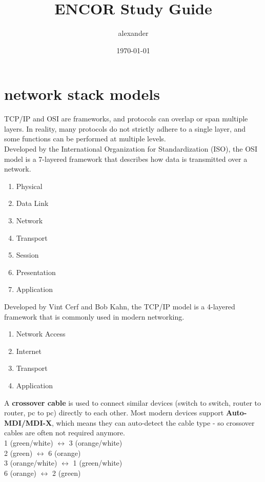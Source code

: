 \documentclass{article}
\title{ENCOR Study Guide}
\author{alexander}
\date{\today}
\begin{document}
\maketitle

\section*{network stack models}

TCP/IP and OSI are frameworks, and protocols can overlap or span multiple layers. In reality, many protocols do not strictly adhere to a single layer, and some functions can be performed at multiple levels.\\

Developed by the International Organization for Standardization (ISO), the OSI model is a 
7-layered framework that describes how data is transmitted over a network.	
	\begin{enumerate}
		\item Physical
		\item Data Link
		\item Network
		\item Transport
		\item Session
		\item Presentation
		\item Application
	\end{enumerate}

Developed by Vint Cerf and Bob Kahn, the TCP/IP model is a 4-layered framework that is commonly 
used in modern networking.
	\begin{enumerate}
		\item Network Access
		\item Internet
		\item Transport
		\item Application
	\end{enumerate}

A \textbf{crossover cable} is used to connect similar devices (switch to switch, router to router, pc to pc)  directly to each other. Most modern devices support \textbf{Auto-MDI/MDI-X}, which means they can auto-detect the cable type - so crossover cables are often not required anymore.\\

1 (green/white) $\leftrightarrow$ 3 (orange/white)\\
2 (green) $\leftrightarrow$ 6 (orange)\\
3 (orange/white) $\leftrightarrow$ 1 (green/white)\\
6 (orange) $\leftrightarrow$ 2 (green)\\
\end{document}
